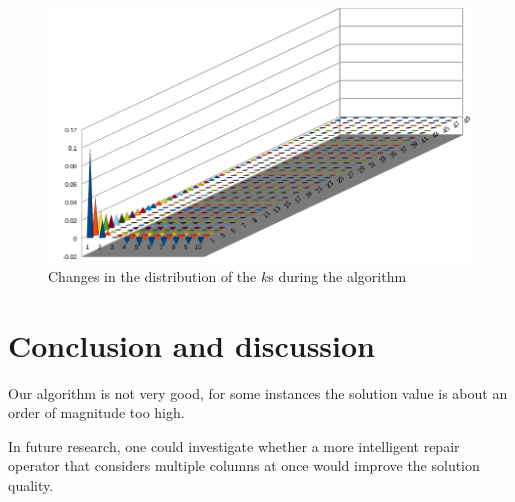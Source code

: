 \documentclass{article}
\begin{document}
\begin{figure}
	\includegraphics[width=\linewidth]{"kdist-diff.png"}
	\caption{Changes in the distribution of the $k$s during the algorithm}
	\label{distdiff}
\end{figure}

\section{Conclusion and discussion}

Our algorithm is not very good, for some instances the solution value is about an order of magnitude too high.

In future research, one could investigate whether a more intelligent repair operator that considers multiple columns at once would improve the solution quality.


\printbibliography
\end{document}
